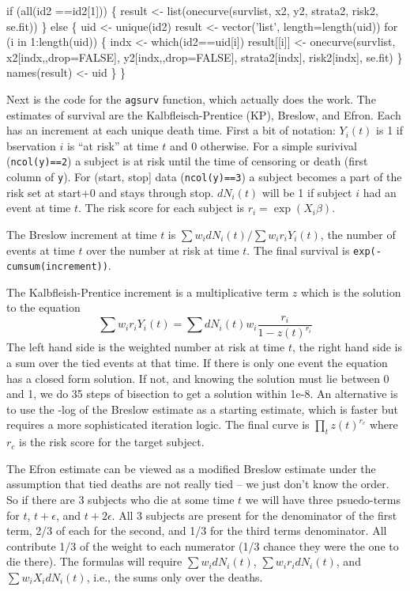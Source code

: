 \documentclass{article}
\newcommand{\code}[1]{\texttt{#1}}
\begin{document}
\begin{nwchunk}
     if (all(id2 ==id2[1])) \{
         result <- list(onecurve(survlist, x2, y2, strata2, risk2, se.fit))
     \}
     else \{
         uid <- unique(id2)
         result <- vector('list', length=length(uid))
         for (i in 1:length(uid)) \{
             indx <- which(id2==uid[i])
             result[[i]] <- onecurve(survlist, x2[indx,,drop=FALSE], 
                                      y2[indx,,drop=FALSE], 
                                      strata2[indx],  risk2[indx], se.fit)
         \}
         names(result) <- uid
     \}
 \}
\end{nwchunk}

Next is the code for the \code{agsurv} function, which actually does the work.
The estimates of survival are the Kalbfleisch-Prentice (KP), Breslow, and
Efron.  Each has an increment at each unique death time.
First a bit of notation:
$Y_i(t)$ is 1 if bservation $i$ is ``at risk'' at time $t$ and 0 otherwise.
For a simple surivival (\code{ncol(y)==2}) a subject is at risk until the
time of censoring or death (first column of \code{y}).
For (start, stop] data (\code{ncol(y)==3}) a subject becomes a
part of the risk set at start+0 and stays through stop.  
$dN_i(t)$ will be 1 if subject $i$ had an event at time $t$.
The risk score for each subject is $r_i = \exp(X_i \beta)$. 

The Breslow increment at time $t$ is $\sum w_i dN_i(t) / \sum  w_i r_i Y_i(t)$,
the number of events at time $t$ over the number at risk at time $t$.
The final survival is \code{exp(-cumsum(increment))}.

The Kalbfleish-Prentice increment is a multiplicative term $z$
which is the solution to the equation
$$
\sum  w_i r_i Y_i(t) = \sum dN_i(t) w_i \frac{r_i}{1- z(t)^{r_i}}
$$
The left hand side is the weighted number at risk at time $t$, the
right hand side is a sum over the tied events at that time.
If there is only one event the equation has a closed form solution.
If not, and knowing the solution must lie between 0 and 1, we do
35 steps of bisection to get a solution within 1e-8.
An alternative is to use the -log of the Breslow estimate as a starting
estimate, which is faster but requires a more sophisticated iteration logic.
The final curve is $\prod_t  z(t)^{r_c}$ where $r_c$ is the risk score
for the target subject.

The Efron estimate can be viewed as a modified Breslow estimate under the
assumption that tied deaths are not really tied -- we just don't know the  %
order.  So if there are 3 subjects who die at some time $t$ we will have
three psuedo-terms for $t$, $t+\epsilon$, and $t+  2\epsilon$.  All 3 subjects
are present for the denominator of the first term, 2/3 of each for the second,
and 1/3 for the third terms denominator.  All contribute 1/3 of the weight
to each numerator (1/3 chance they were the one to die there).  The formulas
will require $\sum w_i dN_i(t)$, $\sum w_ir_i dN_i(t)$, and $\sum w_i X_i
dN_i(t)$, i.e., the sums only over the deaths.  
\end{document}
